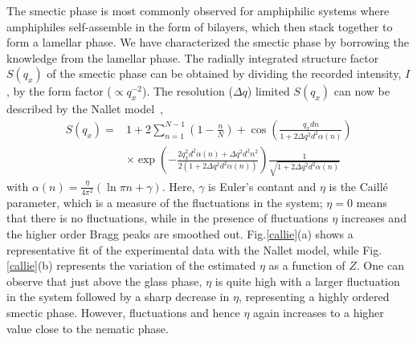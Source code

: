 \documentclass[aps,prl,preprint,superscriptaddress]{revtex4-1} %
\begin{document}
The smectic phase is most commonly observed for amphiphilic systems where amphiphiles self-assemble in the form of bilayers, which then stack together to form a lamellar phase. We have characterized the smectic phase by borrowing the knowledge from the lamellar phase. The radially integrated structure factor $S(q_x)$ of the smectic phase can be obtained by dividing the recorded intensity, $I$, by the form factor ($\propto q_x^{-2}$). The resolution ($\Delta q$) limited $S(q_x)$ can now be described by the Nallet model~\cite{nallet1993modelling}, 
\begin{equation}
\label{eq1:}
\begin{split}
S(q_x) = &1+2\sum_{n=1}^{N-1} (1-\frac{n}{N}) +\cos(\frac{q_x d n}{1+2\Delta q^2 d^2 \alpha(n)})\\
&\times\exp(-\frac{2q_x^2 d^2\alpha(n)+\Delta q^2 d^2 n^2}{2(1+2\Delta q^2 d^2 \alpha(n))})\frac{1}{\sqrt{1+2\Delta q^2 d^2 \alpha (n)}}
\end{split}
\end{equation}
\noindent with $\alpha(n)=\frac{\eta}{4\pi^2}(\ln \pi n + \gamma)$. Here, $\gamma$ is Euler's contant and $\eta$ is the Caill\'{e} parameter, which is a measure of the fluctuations in the system; $\eta=0$ means that there is no fluctuations, while in the presence of fluctuations $\eta$ increases and the higher order Bragg peaks are smoothed out. Fig.\ref{callie}(a) shows a representative fit of the experimental data with the Nallet model, while Fig.\ref{callie}(b) represents the variation of the estimated $\eta$ as a function of $Z$. One can observe that just above the glass phase, $\eta$ is quite high with a larger fluctuation in the system followed by a sharp decrease in $\eta$, representing a highly ordered smectic phase. However, fluctuations and hence $\eta$ again increases to a higher value close to the nematic phase.\par  
\end{document}
